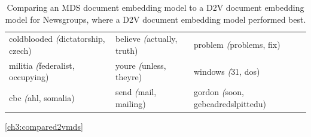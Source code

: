 \begin{table}[]
\begin{tabular}{lll}
		coldblooded \textit({dictatorship, czech)}      & believe \textit({actually, truth)}        & problem \textit({problems, fix)}                    \\
		militia \textit({federalist, occupying)}        & youre \textit({unless, theyre)}           & windows \textit({31, dos)}                          \\
		cbc \textit({ahl, somalia)}                     & send \textit({mail, mailing)}             & gordon \textit({soon, gebcadredslpittedu)}         
	\end{tabular}
	\caption{Comparing an MDS document embedding model to a D2V document embedding model for Newsgroups, where a D2V document embedding model performed best.}\ref{ch3:compared2vmds}
\end{table}





